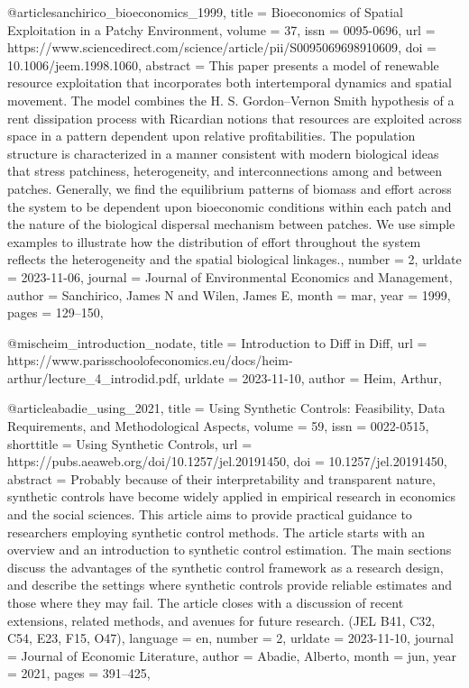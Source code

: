 @article{sanchirico_bioeconomics_1999,
	title = {Bioeconomics of {Spatial} {Exploitation} in a {Patchy} {Environment}},
	volume = {37},
	issn = {0095-0696},
	url = {https://www.sciencedirect.com/science/article/pii/S0095069698910609},
	doi = {10.1006/jeem.1998.1060},
	abstract = {This paper presents a model of renewable resource exploitation that incorporates both intertemporal dynamics and spatial movement. The model combines the H. S. Gordon–Vernon Smith hypothesis of a rent dissipation process with Ricardian notions that resources are exploited across space in a pattern dependent upon relative profitabilities. The population structure is characterized in a manner consistent with modern biological ideas that stress patchiness, heterogeneity, and interconnections among and between patches. Generally, we find the equilibrium patterns of biomass and effort across the system to be dependent upon bioeconomic conditions within each patch and the nature of the biological dispersal mechanism between patches. We use simple examples to illustrate how the distribution of effort throughout the system reflects the heterogeneity and the spatial biological linkages.},
	number = {2},
	urldate = {2023-11-06},
	journal = {Journal of Environmental Economics and Management},
	author = {Sanchirico, James N and Wilen, James E},
	month = mar,
	year = {1999},
	pages = {129--150},
}

@misc{heim_introduction_nodate,
	title = {Introduction to {Diff} in {Diff}},
	url = {https://www.parisschoolofeconomics.eu/docs/heim-arthur/lecture_4_introdid.pdf},
	urldate = {2023-11-10},
	author = {Heim, Arthur},
}

@article{abadie_using_2021,
	title = {Using {Synthetic} {Controls}: {Feasibility}, {Data} {Requirements}, and {Methodological} {Aspects}},
	volume = {59},
	issn = {0022-0515},
	shorttitle = {Using {Synthetic} {Controls}},
	url = {https://pubs.aeaweb.org/doi/10.1257/jel.20191450},
	doi = {10.1257/jel.20191450},
	abstract = {Probably because of their interpretability and transparent nature, synthetic controls have become widely applied in empirical research in economics and the social sciences. This article aims to provide practical guidance to researchers employing synthetic control methods. The article starts with an overview and an introduction to synthetic control estimation. The main sections discuss the advantages of the synthetic control framework as a research design, and describe the settings where synthetic controls provide reliable estimates and those where they may fail. The article closes with a discussion of recent extensions, related methods, and avenues for future research. (JEL B41, C32, C54, E23, F15, O47)},
	language = {en},
	number = {2},
	urldate = {2023-11-10},
	journal = {Journal of Economic Literature},
	author = {Abadie, Alberto},
	month = jun,
	year = {2021},
	pages = {391--425},
}


